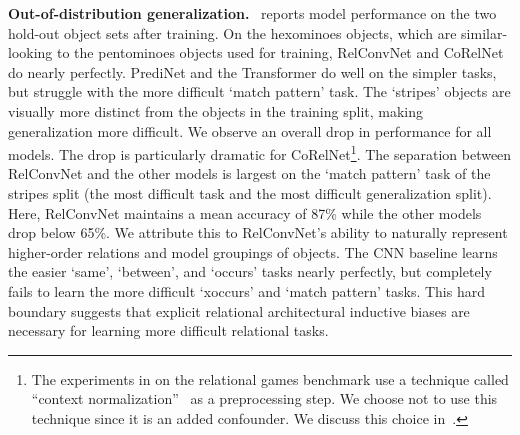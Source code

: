 \textbf{Out-of-distribution generalization.}~ reports model performance on the two hold-out object sets after training. On the hexominoes objects, which are similar-looking to the pentominoes objects used for training, RelConvNet and CoRelNet do nearly perfectly. PrediNet and the Transformer do well on the simpler tasks, but struggle with the more difficult `match pattern' task. The `stripes' objects are visually more distinct from the objects in the training split, making generalization more difficult. We observe an overall drop in performance for all models. The drop is particularly dramatic for CoRelNet\footnote{The experiments in \citet{kergNeuralArchitecture2022} on the relational games benchmark use a technique called ``context normalization''~\citep{webbLearningRepresentationsThat2020} as a preprocessing step. We choose not to use this technique since it is an added confounder. We discuss this choice in~.}.
The separation between RelConvNet and the other models is largest on the `match pattern' task of the stripes split (the most difficult task and the most difficult generalization split). Here, RelConvNet maintains a mean accuracy of 87\% while the other models drop below 65\%. We attribute this to RelConvNet's ability to naturally represent higher-order relations and model groupings of objects. The CNN baseline learns the easier `same', `between', and `occurs' tasks nearly perfectly, but completely fails to learn the more difficult `xoccurs' and `match pattern' tasks. This hard boundary suggests that explicit relational architectural inductive biases are necessary for learning more difficult relational tasks.

